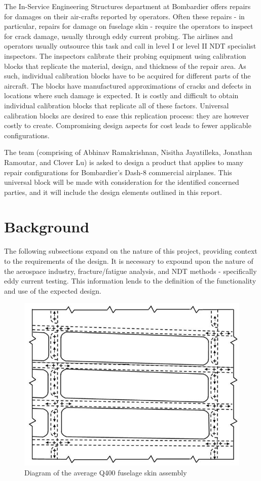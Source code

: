 \documentclass[12pt]{article}
\begin{document}
The In-Service Engineering Structures department at Bombardier offers repairs for damages on their air-crafts reported by operators. Often these repairs - in particular, repairs for damage on fuselage skin - require the operators to inspect for crack damage, usually through eddy current probing. The airlines and operators usually outsource this task and call in level I or level II NDT specialist inspectors. The inspectors calibrate their probing equipment using calibration blocks that replicate the material, design, and thickness of the repair area. As such, individual calibration blocks have to be acquired for different parts of the aircraft. The blocks have manufactured approximations of cracks and defects in locations where such damage is expected. It is costly and difficult to obtain individual calibration blocks that replicate all of these factors. Universal calibration blocks are desired to ease this replication process: they are however costly to create. Compromising design aspects for cost leads to fewer applicable configurations. 

The team (comprising of Abhinav Ramakrishnan, Nisitha Jayatilleka, Jonathan Ramoutar, and Clover Lu) is asked to design a product that applies to many repair configurations for Bombardier's Dash-8 commercial airplanes. This universal block will be made with consideration for the identified concerned parties, and it will include the design elements outlined in this report.
\newpage
\section{Background}

The following subsections expand on the nature of this project, providing context to the requirements of the design. It is necessary to expound upon the nature of the aerospace industry, fracture/fatigue analysis, and NDT methods - specifically eddy current testing. This information lends to the definition of the functionality and use of the expected design.

\begin{figure}[h!]
  \centering
  	\includegraphics[width=\textwidth]{image1}
  \caption{Diagram of the average Q400 fuselage skin assembly}
  \label{fig:fig1}
\end{figure}	
\end{document}
